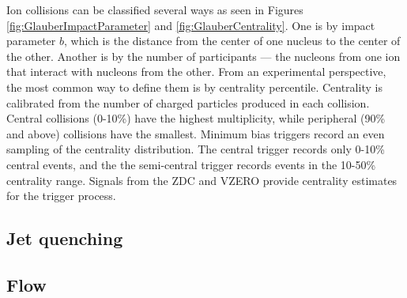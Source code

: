 Ion collisions can be classified several ways \cite{Abelev:2013xaa} as seen in Figures \ref{fig:GlauberImpactParameter} and \ref{fig:GlauberCentrality}.
One is by impact parameter $b$, which is the distance from the center of one nucleus to the center of the other.
Another is by the number of participants --- the nucleons from one ion that interact with nucleons from the other.
From an experimental perspective, the most common way to define them is by centrality percentile.
Centrality is calibrated from the number of charged particles produced in each collision.
Central collisions (0-10\%) have the highest multiplicity, while peripheral (90\% and above) collisions have the smallest.
Minimum bias triggers record an even sampling of the centrality distribution.
The central trigger records only 0-10\% central events, and the the semi-central trigger records events in the 10-50\% centrality range.
Signals from the ZDC and VZERO provide centrality estimates for the trigger process.



\subsection{Jet quenching}


\subsection{Flow}
\label{sec:Flow}


